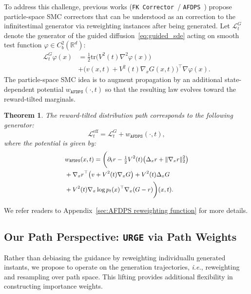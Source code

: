 \documentclass{article}
\theoremstyle{plain}
\newtheorem{theorem}{Theorem}[section]
\theoremstyle{definition}
\theoremstyle{remark}
\newcommand{\R}{{\mathbb{R}}}
\begin{document}
To address this challenge, previous works (\texttt{FK Corrector}~\cite{skreta2025feynman}/ \texttt{AFDPS}~\cite{chen2025solving}) propose particle-space SMC correctors that can be understood as an correction to the infinitestimal generator via reweighting instances after being generated. Let $\mathcal L^G_t$ denote the generator of the guided diffusion~\eqref{eq:guided_sde} acting on smooth test function  $\varphi\in C_b^2(\R^d)$:
\[
\begin{aligned}
    \mathcal L^G_t\varphi(x) &= \frac{1}{2} \mathrm{tr}\big(V^2(t) \nabla^2 \varphi(x)\big) \\
    &+ \big(v(x,t)+V^2(t)\nabla_x G(x,t)\big)^\top \nabla\varphi(x).
\end{aligned}
\] 
The particle-space SMC idea is to augment propagation by an additional state-dependent potential $w_{\texttt{AFDPS}}(\cdot,t)$ so that the resulting law evolves toward the reward-tilted marginals.

\begin{theorem}
\label{theorem:AFDPSgenerator}
    The reward-tilted distribution path corresponds to the following generator:
    \begin{equation}
        \mathcal L_t^\mathrm{eff} = \mathcal L^G_t + w_{\texttt{AFDPS}}(\cdot,t),
    \end{equation}
    where the potential is given by:
    \[
    \small
    \begin{aligned}
        &w_{\texttt{AFDPS}}(x,t) = \bigg(\partial_t r -\tfrac12 V^2(t)\big(\Delta_x r+\|\nabla_x r\|^2_2\big)  \\
        &+ \nabla_x r^{\top}\big(v+V^2(t)\nabla_x G\big) + V^2(t)\Delta_x G \\
        &+ V^2(t)\nabla_x\log p_t(x)^{\top}\nabla_x(G-r)\bigg)(x,t).
    \end{aligned}
    \] 
\end{theorem}

We refer readers to Appendix~\ref{sec:AFDPS reweighting function} for more details.

\subsection{Our Path Perspective: \texttt{URGE} via Path Weights}

Rather than debiasing the guidance by reweighting individuallu generated instants, we propose to operate on the generation trajectories, \emph{i.e.}, reweighting and resampling over path space. This lifting provides additional flexibility in constructing importance weights. 
\end{document}
